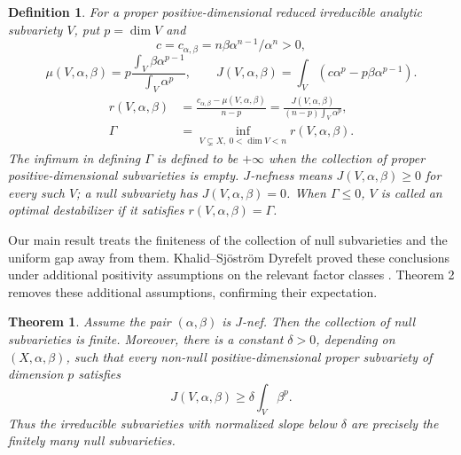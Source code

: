 \documentclass[reqno]{amsart}
\theoremstyle{remark}
\newcommand{\cab}{c_{\alpha,\beta}}
\theoremstyle{plain}
\newtheorem{theorem}[thm]{Theorem}
\newtheorem{definition}[thm]{Definition}
\begin{document}
\begin{definition}\label{def:numerical}For a proper positive-dimensional reduced irreducible analytic subvariety \(V\), put \(p=\dim V\) and
\[
c=\cab=n\beta\alpha^{n-1}/{\alpha^n}>0,
\]
\[
\mu(V,\alpha,\beta)=p\frac{\int_V\beta\alpha^{p-1}}{\int_V\alpha^p},\qquad
J(V,\alpha,\beta)=\int_V(c\alpha^p-p\beta\alpha^{p-1}).
\]
\begin{equation}\label{eq:threshold}
\begin{aligned}
r(V,\alpha,\beta)&=\frac{\cab-\mu(V,\alpha,\beta)}{n-p}
=\frac{J(V,\alpha,\beta)}{(n-p)\int_V\alpha^p},\\
\Gamma&=\inf_{V\subsetneq X,\ 0<\dim V<n}r(V,\alpha,\beta).
\end{aligned}
\end{equation}
The infimum in defining $\Gamma$ is defined to be $+\infty$ when the collection of proper positive-dimensional subvarieties is empty.  \(J\)-nefness means \(J(V,\alpha,\beta)\ge0\) for every such \(V\); a null subvariety has \(J(V,\alpha,\beta)=0\). When $\Gamma\leq 0$, $V$ is called an optimal destabilizer if it satisfies \(r(V,\alpha,\beta)=\Gamma\). 

\end{definition}




Our main result treats the finiteness of the collection of null subvarieties and the uniform gap away from them. Khalid–Sjöström Dyrefelt proved these conclusions under additional positivity assumptions on the relevant factor classes \cite[Theorem 1.5, Remark 1.8 and Theorem 3.10]{KSD26}. Theorem 2 removes these additional assumptions, confirming their expectation.


\begin{samepage}
\begin{theorem}\label{thm:null-finiteness}Assume the pair $(\alpha,\beta)$ is $J$-nef. Then the collection of null subvarieties is finite. Moreover, there is a constant \(\delta>0\), depending on \((X,\alpha,\beta)\), such that every non-null positive-dimensional proper subvariety of dimension $p$ satisfies
\[
J(V,\alpha,\beta)\ge\delta\int_V\beta^p.
\]
Thus the irreducible subvarieties with normalized slope below \(\delta\) are precisely the finitely many null subvarieties.
\end{theorem}
\end{samepage}
\end{document}
